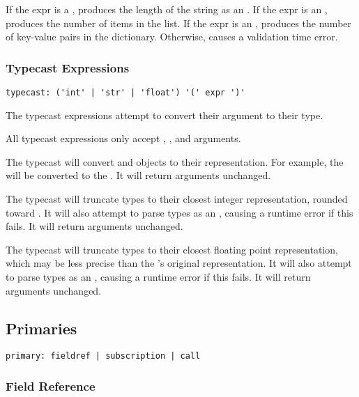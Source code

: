 If the expr is a , produces the length of the string as an .
If the expr is an \code{[T]}, produces the number of items in the list. If the
expr is an , produces the number of key-value pairs in the
dictionary. Otherwise, causes a validation time error.

\subsubsection{Typecast Expressions}

\begin{lstlisting}
typecast: ('int' | 'str' | 'float') '(' expr ')'
\end{lstlisting}

The typecast expressions attempt to convert their argument to their type.

All typecast expressions only accept , , and 
arguments.

The  typecast will convert  and  objects to
their  representation. For example, the   will be
converted to the  . It will return  arguments
unchanged.

The  typecast will truncate  types to their closest
integer representation, rounded toward . It will also attempt to parse
 types as an , causing a runtime error if this fails. It will
return  arguments unchanged.

The  typecast will truncate  types to their closest
floating point representation, which may be less precise than the 's
original representation. It will also attempt to parse  types as an
, causing a runtime error if this fails. It will return 
arguments unchanged.

\subsection{Primaries}
\begin{lstlisting}
primary: fieldref | subscription | call
\end{lstlisting}

\subsubsection{Field Reference}
\label{sec:fieldref}

